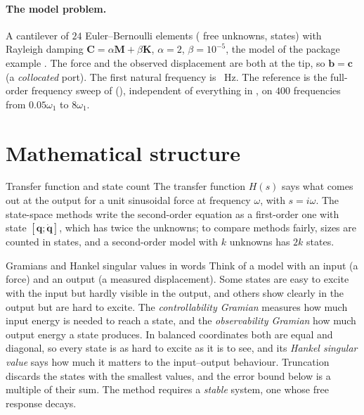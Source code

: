 \paragraph{The model problem.}
A cantilever of $24$ Euler--Bernoulli elements (\cbtNDof{} free unknowns, \cbtNState{} states) with Rayleigh damping $\bm C=\alpha\bm M+\beta\bm K$, $\alpha=2$, $\beta=10^{-5}$, the model of the package example . The force and the observed displacement are both at the tip, so $\bm b=\bm c$ (a \emph{collocated} port). The first natural frequency is \cbtFOne{}~Hz. The reference is the full-order frequency sweep of \fea{} (), independent of everything in \rom{}, on $400$ frequencies from $0.05\omega_1$ to $8\omega_1$.

\section{Mathematical structure}\label{sec:bt-math}

\begin{sidenote}{Transfer function and state count}
The transfer function $H(s)$ says what comes out at the output for a unit sinusoidal force at frequency $\omega$, with $s=i\omega$. The state-space methods write the second-order equation as a first-order one with state $[\bm q;\dot{\bm q}]$, which has twice the unknowns; to compare methods fairly, sizes are counted in states, and a second-order model with $k$ unknowns has $2k$ states.
\end{sidenote}

\begin{sidenote}{Gramians and Hankel singular values in words}
Think of a model with an input (a force) and an output (a measured displacement). Some states are easy to excite with the input but hardly visible in the output, and others show clearly in the output but are hard to excite. The \emph{controllability Gramian} measures how much input energy is needed to reach a state, and the \emph{observability Gramian} how much output energy a state produces. In balanced coordinates both are equal and diagonal, so every state is as hard to excite as it is to see, and its \emph{Hankel singular value} says how much it matters to the input--output behaviour. Truncation discards the states with the smallest values, and the error bound below is a multiple of their sum. The method requires a \emph{stable} system, one whose free response decays.
\end{sidenote}

